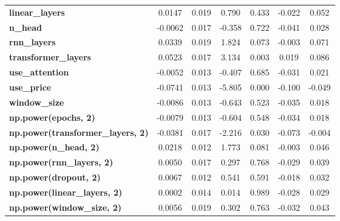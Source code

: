 \begin{center}
\begin{tabular}{lcccccc}
\textbf{linear\_layers}                   &       0.0147  &        0.019     &     0.790  &         0.433        &       -0.022    &        0.052     \\
\textbf{n\_head}                          &      -0.0062  &        0.017     &    -0.358  &         0.722        &       -0.041    &        0.028     \\
\textbf{rnn\_layers}                      &       0.0339  &        0.019     &     1.824  &         0.073        &       -0.003    &        0.071     \\
\textbf{transformer\_layers}              &       0.0523  &        0.017     &     3.134  &         0.003        &        0.019    &        0.086     \\
\textbf{use\_attention}                   &      -0.0052  &        0.013     &    -0.407  &         0.685        &       -0.031    &        0.021     \\
\textbf{use\_price}                       &      -0.0741  &        0.013     &    -5.805  &         0.000        &       -0.100    &       -0.049     \\
\textbf{window\_size}                     &      -0.0086  &        0.013     &    -0.643  &         0.523        &       -0.035    &        0.018     \\
\textbf{np.power(epochs, 2)}              &      -0.0079  &        0.013     &    -0.604  &         0.548        &       -0.034    &        0.018     \\
\textbf{np.power(transformer\_layers, 2)} &      -0.0381  &        0.017     &    -2.216  &         0.030        &       -0.073    &       -0.004     \\
\textbf{np.power(n\_head, 2)}             &       0.0218  &        0.012     &     1.773  &         0.081        &       -0.003    &        0.046     \\
\textbf{np.power(rnn\_layers, 2)}         &       0.0050  &        0.017     &     0.297  &         0.768        &       -0.029    &        0.039     \\
\textbf{np.power(dropout, 2)}             &       0.0067  &        0.012     &     0.541  &         0.591        &       -0.018    &        0.032     \\
\textbf{np.power(linear\_layers, 2)}      &       0.0002  &        0.014     &     0.014  &         0.989        &       -0.028    &        0.029     \\
\textbf{np.power(window\_size, 2)}        &       0.0056  &        0.019     &     0.302  &         0.763        &       -0.032    &        0.043     \\

\end{tabular}
\end{center}
